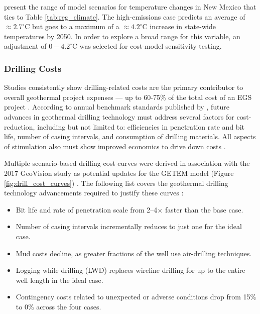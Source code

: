 \citet[Figure 1]{frankson_new_2019} present the range of model scenarios for temperature changes in New Mexico that ties to Table \ref{tab:reg_climate}. The high-emissions case predicts an average of $\approx 2.7^\circ$C but goes to a maximum of a $\approx 4.2^\circ$C increase in state-wide temperatures by 2050. In order to explore a broad range for this variable, an adjustment of $0-4.2^\circ$C was selected for cost-model sensitivity testing.

\subsubsection{Drilling Costs}\label{ch4:drilling_uncertainty}
Studies consistently show drilling-related costs are the primary contributor to overall geothermal project expenses --- up to 60-75\% of the total cost of an EGS project \citep{lukawski_uncertainty_2016}. According to annual benchmark standards published by \citet{nrel_2020_2020}, future advances in geothermal drilling technology must address several factors for cost-reduction, including but not limited to: efficiencies in penetration rate and bit life, number of casing intervals, and consumption of drilling materials. All aspects of stimulation also must show improved economics to drive down costs \citep{nrel_2020_2020}.

Multiple scenario-based drilling cost curves were derived in association with the 2017 GeoVision study as potential updates for the GETEM model (Figure \ref{fig:drill_cost_curves}) \citep{lowry_implications_2017}. The following list covers the geothermal drilling technology advancements required to justify these curves \citep{augustine_geovision_2019}:
\begin{itemize}[itemsep=2pt]
    \item Bit life and rate of penetration scale from 2--4$\times$ faster than the base case.
    \item Number of casing intervals incrementally reduces to just one for the ideal case.
    \item Mud costs decline, as greater fractions of the well use air-drilling techniques.
    \item Logging while drilling (LWD) replaces wireline drilling for up to the entire well length in the ideal case.
    \item Contingency costs related to unexpected or adverse conditions drop from 15\% to 0\% across the four cases.
\end{itemize}

